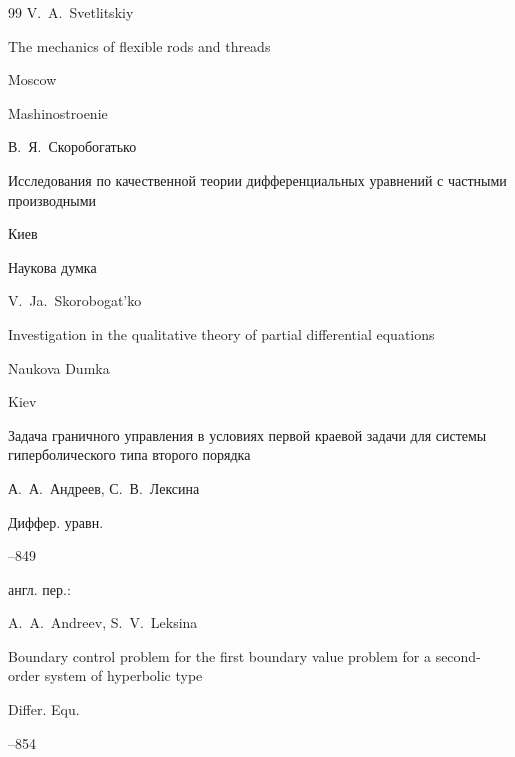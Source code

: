\begin{thebibliography}{99}
\by V.~A.~Svetlitskiy  

\book The mechanics of flexible rods and threads

\publaddr Moscow

\publ Mashinostroenie






\by В.~Я.~Скоробогатько

\book Исследования по качественной теории дифференциальных уравнений с частными производными

\publaddr Киев

\publ Наукова  думка



\misctransl

\by V.~Ja.~Skorobogat'ko

\book Investigation in the qualitative theory of partial differential equations

\publ Naukova Dumka

\publaddr Kiev






\paper Задача граничного управления в условиях первой краевой задачи для системы гиперболического типа второго порядка

\by А.~А.~Андреев, С.~В.~Лексина

\jour Диффер. уравн.




--849

\transl англ. пер.:~

\by A.~A.~Andreev, S.~V.~Leksina

\paper Boundary control problem for the first boundary value problem for a second-order system of hyperbolic type

\jour Differ. Equ. 



--854 







\end{thebibliography}
